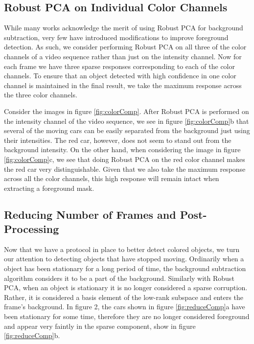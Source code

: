 \documentclass{article}
\begin{document}
\subsection{Robust PCA on Individual Color Channels}

While many works acknowledge the merit of using Robust PCA for background subtraction, very few have introduced modifications to improve foreground detection. As such, we consider performing Robust PCA on all three of the color channels of a video sequence rather than just on the intensity channel. Now for each frame we have three sparse responses corresponding to each of the color channels. To ensure that an object detected with high confidence in one color channel is maintained in the final result, we take the maximum response across the three color channels.

Consider the images in figure \ref{fig:colorComp}. After Robust PCA is performed on the intensity channel of the video sequence, we see in figure \ref{fig:colorComp}b that several of the moving cars can be easily separated from the background just using their intensities. The red car, however, does not seem to stand out  from the background intensity. On the other hand, when considering the image in figure \ref{fig:colorComp}c, we see that doing Robust PCA on the red color channel makes the red car very distinguishable. Given that we also take the maximum response across all the color channels, this high response will remain intact when extracting a foreground mask.

\subsection{Reducing Number of Frames and Post-Processing}

Now that we have a protocol in place to better detect colored objects, we turn our attention to detecting objects that have stopped moving. Ordinarily when a object has been stationary for a long period of time, the background subtraction algorithm considers it  to be a part of the background. Similarly with  Robust PCA, when an object is stationary it is no longer considered a sparse corruption. Rather, it is considered a basis element of the low-rank subspace and enters the frame's background. In figure 2, the cars shown in figure \ref{fig:reduceComp}a have been stationary for some time, therefore they are no longer considered foreground and appear very faintly in the sparse component, show in figure \ref{fig:reduceComp}b.
 
\end{document}
